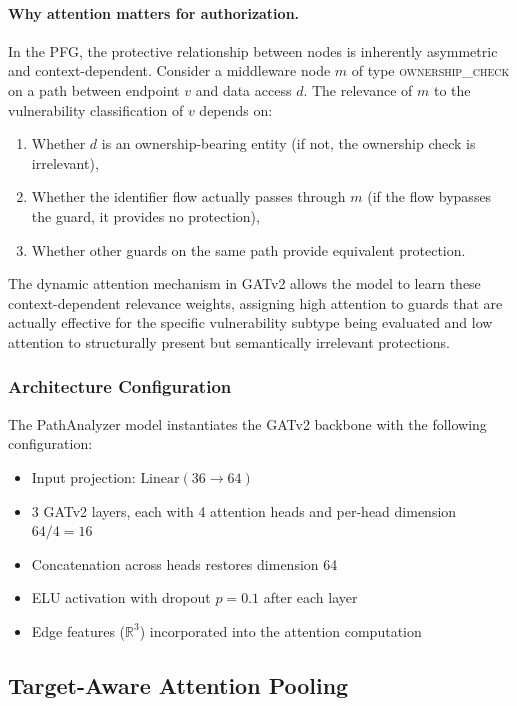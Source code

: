 \paragraph{Why attention matters for authorization.} In the PFG, the protective relationship between nodes is inherently asymmetric and context-dependent. Consider a middleware node $m$ of type \textsc{ownership\_check} on a path between endpoint $v$ and data access $d$. The relevance of $m$ to the vulnerability classification of $v$ depends on:
\begin{enumerate}
    \item Whether $d$ is an ownership-bearing entity (if not, the ownership check is irrelevant),
    \item Whether the identifier flow actually passes through $m$ (if the flow bypasses the guard, it provides no protection),
    \item Whether other guards on the same path provide equivalent protection.
\end{enumerate}

The dynamic attention mechanism in GATv2 allows the model to learn these context-dependent relevance weights, assigning high attention to guards that are actually effective for the specific vulnerability subtype being evaluated and low attention to structurally present but semantically irrelevant protections.

\subsubsection{Architecture Configuration}

The PathAnalyzer model instantiates the GATv2 backbone with the following configuration:
\begin{itemize}
    \item Input projection: $\text{Linear}(36 \to 64)$
    \item 3 GATv2 layers, each with 4 attention heads and per-head dimension $64/4 = 16$
    \item Concatenation across heads restores dimension 64
    \item ELU activation with dropout $p = 0.1$ after each layer
    \item Edge features ($\mathbb{R}^3$) incorporated into the attention computation
\end{itemize}

\subsection{Target-Aware Attention Pooling}

